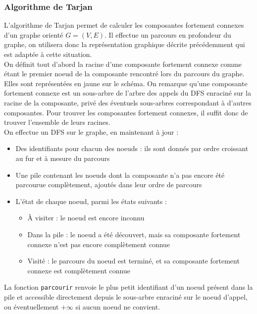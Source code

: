 \documentclass[11pt,a4paper]{article}
\begin{document}
    \subsubsection{Algorithme de Tarjan}
L'algorithme de Tarjan permet de calculer les composantes fortement connexes d'un graphe orienté \(G=(V,E)\). Il effectue un parcours en profondeur du graphe, on utilisera donc la représentation graphique décrite précédemment qui est adaptée à cette situation. \\
On définit tout d'abord la racine d'une composante fortement connexe comme étant le premier noeud de la composante rencontré lors du parcours du graphe. Elles sont représentées en jaune sur le schéma. On remarque qu'une composante fortement connexe est un sous-arbre de l'arbre des appels du DFS enraciné sur la racine de la composante, privé des éventuels sous-arbres correspondant à d'autres composantes. Pour trouver les composantes fortement connexes, il suffit donc de trouver l'ensemble de leurs racines. \\
On effectue un DFS sur le graphe, en maintenant à jour :
\begin{itemize}
  \item Des identifiants pour chacun des noeuds : ils sont donnés par ordre croissant au fur et à mesure du parcours
  \item Une pile contenant les noeuds dont la composante n'a pas encore été parcourue complètement, ajoutés dans leur ordre de parcours
  \item L'état de chaque noeud, parmi les états suivants :
    \begin{itemize}
      \item À visiter : le noeud est encore inconnu
      \item Dans la pile : le noeud a été découvert, mais sa composante fortement connexe n'est pas encore complètement connue
      \item Visité : le parcours du noeud est terminé, et sa composante fortement connexe est complètement connue
    \end{itemize}
\end{itemize}

La fonction \lstinline|parcourir| renvoie le plus petit identifiant d'un noeud présent dans la pile et accessible directement depuis le sous-arbre enraciné sur le noeud d'appel, ou éventuellement \(+\infty\) si aucun noeud ne convient.
\end{document}
